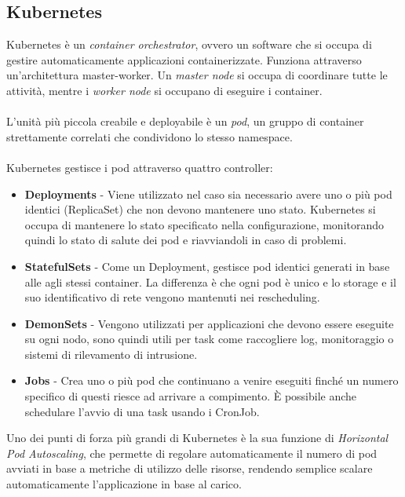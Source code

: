 \subsection{Kubernetes}
Kubernetes\cite{kubernetesdoc} \`e un \textit{container orchestrator}, ovvero un software che si occupa di gestire automaticamente applicazioni containerizzate.
Funziona attraverso un'architettura master-worker. Un \textit{master node} si occupa di coordinare tutte le attivit\`a, mentre i \textit{worker node} si occupano di eseguire i container.
\\\\
L'unit\`a pi\`u piccola creabile e deployabile \`e un \textit{pod}, un gruppo di container strettamente correlati che condividono lo stesso namespace.
\\\\
Kubernetes gestisce i pod attraverso quattro controller:
\begin{itemize}
  \item \textbf{Deployments} - Viene utilizzato nel caso sia necessario avere uno o pi\`u pod identici (ReplicaSet) che non devono mantenere uno stato. Kubernetes si occupa
    di mantenere lo stato specificato nella configurazione, monitorando quindi lo stato di salute dei pod e riavviandoli in caso di problemi.
  \item \textbf{StatefulSets} - Come un Deployment, gestisce pod identici generati in base alle agli stessi container. La differenza \`e che ogni pod \`e unico
    e lo storage e il suo identificativo di rete vengono mantenuti nei rescheduling.
  \item \textbf{DemonSets} - Vengono utilizzati per applicazioni che devono essere eseguite su ogni nodo, sono quindi utili per task come raccogliere log, monitoraggio o sistemi di rilevamento di intrusione.
  \item \textbf{Jobs} - Crea uno o pi\`u pod che continuano a venire eseguiti finch\'e un numero specifico di questi riesce ad arrivare a compimento. \`E possibile anche schedulare l'avvio di
    una task usando i CronJob.
\end{itemize}
Uno dei punti di forza pi\`u grandi di Kubernetes \`e la sua funzione di \textit{Horizontal Pod Autoscaling}, che permette di regolare automaticamente il numero di pod avviati in base a
metriche di utilizzo delle risorse, rendendo semplice scalare automaticamente l'applicazione in base al carico.
